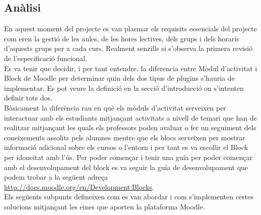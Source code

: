 \documentclass[a4paper]{report}  %
\begin{document}
\subsection{Anàlisi}
En aquest moment del projecte es van plasmar els requisits essencials del projecte com eren la gestió de les aules, de les hores lectives, dels grups i dels horaris d'aquests grups per a cada curs.
Realment senzills si s'observa la primera revisió de l'especificació funcional.\\
Es va tenir que decidir, i per tant entendre, la diferencia entre Mòdul d'activitat i Block de Moodle per determinar quin dels dos tipus de plugins s'hauria de implementar. Es pot veure la definició en la secció d'introducció on s'intenten definir tots dos.\\
Bàsicament la diferència rau en què els mòduls d'activitat serveixen per interactuar amb els estudiants mitjançant activitats a nivell de temari que han de realitzar mitjançant les quals els professors poden avaluar o fer un seguiment dels coneixements assolits pels alumnes mentre que els blocs serveixen per mostrar informació adicional sobre els cursos o l'entorn i per tant es va escollir el Block per idoneïtat amb l'ús. Per poder començar i tenir una guía per poder començar amb el desenvolupament del block es va seguir la guía de desenvolupament que podem trobar a la següent adreça \url{http://docs.moodle.org/en/Development:Blocks}.\\
Els següents subpunts defineixen com es van abordar i com s'implementen certes solucions mitjançant les eines que aporten la plataforma Moodle.\\
\end{document}
